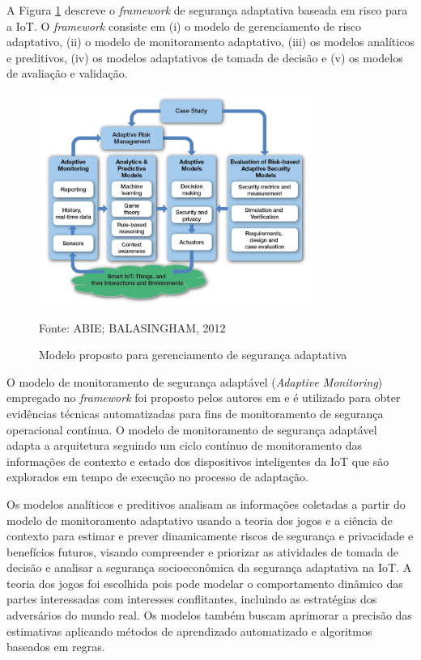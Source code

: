 \documentclass[tid,table]{texufpel} %
\begin{document}
A Figura \ref{adaptive-security-management-model} descreve o \textit{framework} de segurança adaptativa baseada em risco para a IoT. O \textit{framework} consiste em (i) o modelo de gerenciamento de risco adaptativo, (ii) o modelo de monitoramento adaptativo, (iii) os modelos analíticos e preditivos, (iv) os modelos adaptativos de tomada de decisão e (v) os modelos de avaliação e validação.

\begin{figure}[ht]
\centering
\includegraphics[width=0.8\textwidth]{imagens/adaptive-security-management-model.png}
\caption{Modelo proposto para gerenciamento de segurança adaptativa}
\label{adaptive-security-management-model}
Fonte: ABIE; BALASINGHAM, 2012
\end{figure}

O modelo de monitoramento de segurança adaptável (\textit{Adaptive Monitoring}) empregado no \textit{framework} foi proposto pelos autores em \cite{abie10} e é utilizado para obter evidências técnicas automatizadas para fins de monitoramento de segurança operacional contínua. O modelo de monitoramento de segurança adaptável adapta a arquitetura seguindo um ciclo contínuo de monitoramento das informações de contexto e estado dos dispositivos inteligentes da IoT que são explorados em tempo de execução no processo de adaptação.

Os modelos analíticos e preditivos analisam as informações coletadas  a partir do modelo de monitoramento adaptativo usando a teoria dos jogos e a ciência de contexto para estimar e prever dinamicamente riscos de segurança e privacidade e benefícios futuros, visando compreender e priorizar as atividades de tomada de decisão e analisar a segurança socioeconômica da segurança adaptativa na IoT. A teoria dos jogos foi escolhida pois pode modelar o comportamento dinâmico das partes interessadas com interesses conflitantes, incluindo as estratégias dos adversários do mundo real. Os modelos também buscam aprimorar a precisão das estimativas aplicando métodos de aprendizado automatizado e algoritmos baseados em regras.
\end{document}
